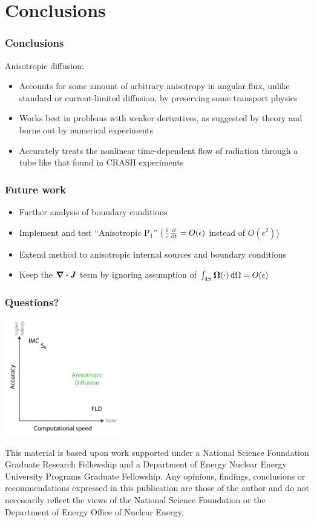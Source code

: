 \documentclass{beamer}
\begin{document}
\section{Conclusions}
\begin{frame}
  \frametitle{Conclusions}
  Anisotropic diffusion:
  \begin{itemize}
    \item Accounts for some amount of arbitrary anisotropy in
      angular flux, unlike standard or current-limited diffusion, by
      preserving some transport physics
    \item Works best in problems with weaker derivatives, as suggested by
      theory and borne out by numerical experiments
    \item Accurately treats the nonlinear time-dependent flow of radiation
      through a tube like that found in CRASH experiments
  \end{itemize}
\end{frame}
\begin{frame}
  \frametitle{Future work}
  \begin{itemize}
    \item Further analysis of boundary conditions
    \item Implement and test ``Anisotropic P$_1$''
      ($\frac1c\frac{\partial }{\partial t}=O(\epsilon)$ instead of $O(\epsilon^2)$)
    \item Extend method to anisotropic internal sources and boundary conditions
    \item Keep the $\bm{\nabla} \bm{\cdot} \bm{J}$ term by ignoring assumption of
      $\int_{4\pi} \bm{\Omega} (\cdot) \mathop{}\!\mathrm{d}\Omega = O(\epsilon)$ 
  \end{itemize}
\end{frame}
\appendix
\begin{frame}
  \frametitle{Questions?}
  \begin{center}
    \includegraphics[width=2in]{../figures/fidelity2}
  \end{center}
{\setlength{\baselineskip}{-\baselineskip} \tiny 
This material is based upon work supported under a National Science Foundation
Graduate Research Fellowship and a Department of Energy Nuclear Energy
University Programs Graduate Fellowship. Any opinions, findings, conclusions or
recommendations expressed in this publication are those of the author and do
not necessarily reflect the views of the National Science Foundation or the
Department of Energy Office of Nuclear Energy.\par}
\end{frame}
\end{document}

